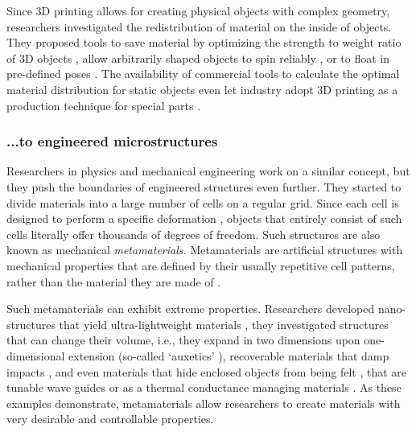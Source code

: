 Since 3D printing allows for creating physical objects with complex geometry, researchers investigated the redistribution of material on the inside of objects. They proposed tools to save material by optimizing the strength to weight ratio of 3D objects \cite{Lu2014}, allow arbitrarily shaped objects to spin reliably \cite{Bacher2014a}, or to float in pre-defined poses \cite{Prevost2016}. The availability of commercial tools \cite{AutodeskNetfabb2018, AutodeskWithin2018} to calculate the optimal material distribution for static objects even let industry adopt 3D printing as a production technique for special parts \cite{Sclupteo2018}.


\subsubsection{...to engineered microstructures}

Researchers in physics and mechanical engineering work on a similar concept, but they push the boundaries of engineered structures even further. They started to divide materials into a large number of cells on a regular grid. Since each cell is designed to perform a specific deformation \cite{Overvelde2012a}, objects that entirely consist of such cells literally offer thousands of degrees of freedom. Such structures are also known as mechanical \textit{metamaterials.} Metamaterials are artificial structures with mechanical properties that are defined by their usually repetitive cell patterns, rather than the material they are made of \cite{Bertoldi2017, Christensen2015, Paulose2015}.

Such metamaterials can exhibit extreme properties. Researchers developed nano-structures that yield ultra-lightweight materials \cite{Meza2014, Meza2015}, they investigated structures that can change their volume, i.e., they expand in two dimensions upon one-dimensional extension (so-called `auxetics' \cite{Lakes1987, Bertoldi2010, Jiang2018}), recoverable materials that damp impacts \cite{Frenzel2016a, Shan2015}, and even materials that hide enclosed objects from being felt \cite{Buckmann2015a}, that are tunable wave guides \cite{Babaee2016, Memoli2017} or as a thermal conductance managing materials \cite{Phoenix2017}. As these examples demonstrate, metamaterials allow researchers to create materials with very desirable and controllable
properties.


